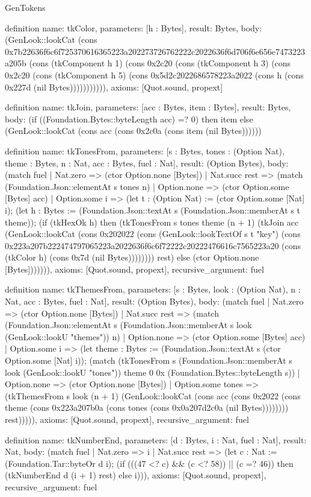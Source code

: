 \begin{lexlean}{GenTokens}
\begin{semanticmodule}
definition{
  name: tkColor,
  parameters: [h : Bytes],
  result: Bytes,
  body: (GenLook::lookCat (cons 0x7b22636f6c6f725370616365223a202273726762222c2022636f6d706f6e656e7473223a205b (cons (tkComponent h 1) (cons 0x2c20 (cons (tkComponent h 3) (cons 0x2c20 (cons (tkComponent h 5) (cons 0x5d2c2022686578223a2022 (cons h (cons 0x227d (nil Bytes))))))))))),
  axioms: [Quot.sound, propext]
}

definition{
  name: tkJoin,
  parameters: [acc : Bytes, item : Bytes],
  result: Bytes,
  body: (if ((Foundation.Bytes::byteLength acc) =? 0) then item else (GenLook::lookCat (cons acc (cons 0x2c0a (cons item (nil Bytes))))))
}

definition{
  name: tkTonesFrom,
  parameters: [s : Bytes, tones : (Option Nat), theme : Bytes, n : Nat, acc : Bytes, fuel : Nat],
  result: (Option Bytes),
  body: (match fuel
    | Nat.zero => (ctor Option.none [Bytes])
    | Nat.succ rest => (match (Foundation.Json::elementAt s tones n)
      | Option.none => (ctor Option.some [Bytes] acc)
      | Option.some i => (let t : (Option Nat) := (ctor Option.some [Nat] i); (let h : Bytes := (Foundation.Json::textAt s (Foundation.Json::memberAt s t theme)); (if (tkHexOk h) then (tkTonesFrom s tones theme (n + 1) (tkJoin acc (GenLook::lookCat (cons 0x202022 (cons (GenLook::lookTextOf s t "key") (cons 0x223a207b222474797065223a2022636f6c6f72222c20222476616c7565223a20 (cons (tkColor h) (cons 0x7d (nil Bytes)))))))) rest) else (ctor Option.none [Bytes])))))),
  axioms: [Quot.sound, propext],
  recursive_argument: fuel
}

definition{
  name: tkThemesFrom,
  parameters: [s : Bytes, look : (Option Nat), n : Nat, acc : Bytes, fuel : Nat],
  result: (Option Bytes),
  body: (match fuel
    | Nat.zero => (ctor Option.none [Bytes])
    | Nat.succ rest => (match (Foundation.Json::elementAt s (Foundation.Json::memberAt s look (GenLook::lookU "themes")) n)
      | Option.none => (ctor Option.some [Bytes] acc)
      | Option.some i => (let theme : Bytes := (Foundation.Json::textAt s (ctor Option.some [Nat] i)); (match (tkTonesFrom s (Foundation.Json::memberAt s look (GenLook::lookU "tones")) theme 0 0x (Foundation.Bytes::byteLength s))
        | Option.none => (ctor Option.none [Bytes])
        | Option.some tones => (tkThemesFrom s look (n + 1) (GenLook::lookCat (cons acc (cons 0x2022 (cons theme (cons 0x223a207b0a (cons tones (cons 0x0a207d2c0a (nil Bytes)))))))) rest))))),
  axioms: [Quot.sound, propext],
  recursive_argument: fuel
}

definition{
  name: tkNumberEnd,
  parameters: [d : Bytes, i : Nat, fuel : Nat],
  result: Nat,
  body: (match fuel
    | Nat.zero => i
    | Nat.succ rest => (let c : Nat := (Foundation.Tar::byteOr d i); (if (((47 <? c) && (c <? 58)) || (c =? 46)) then (tkNumberEnd d (i + 1) rest) else i))),
  axioms: [Quot.sound, propext],
  recursive_argument: fuel
}


\end{semanticmodule}
\end{lexlean}

